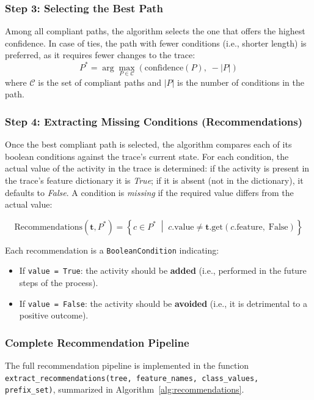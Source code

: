 \documentclass{article}
\begin{document}
\subsubsection{Step 3: Selecting the Best Path}

Among all compliant paths, the algorithm selects the one that offers the highest confidence. In case of ties, the path with fewer conditions (i.e., shorter length) is preferred, as it requires fewer changes to the trace:
\[
P^* = \arg\max_{P \in \mathcal{C}} \left( \text{confidence}(P), \; -|P| \right)
\]
where $\mathcal{C}$ is the set of compliant paths and $|P|$ is the number of conditions in the path.

\subsubsection{Step 4: Extracting Missing Conditions (Recommendations)}

Once the best compliant path is selected, the algorithm compares each of its boolean conditions against the trace's current state. For each condition, the actual value of the activity in the trace is determined: if the activity is present in the trace's feature dictionary it is \textit{True}; if it is absent (not in the dictionary), it defaults to \textit{False}. A condition is \textit{missing} if the required value differs from the actual value:

\[
\text{Recommendations}(\mathbf{t}, P^*) = \left\{ c \in P^* \;\middle|\; c.\text{value} \neq \mathbf{t}.\text{get}(c.\text{feature},\; \text{False}) \right\}
\]

\noindent
Each recommendation is a \texttt{BooleanCondition} indicating:
\begin{itemize}
    \item If \texttt{value = True}: the activity should be \textbf{added} (i.e., performed in the future steps of the process).
    \item If \texttt{value = False}: the activity should be \textbf{avoided} (i.e., it is detrimental to a positive outcome).
\end{itemize}

\subsubsection{Complete Recommendation Pipeline}

The full recommendation pipeline is implemented in the function \texttt{extract\_recommendations(tree, feature\_names, class\_values, prefix\_set)}, summarized in Algorithm~\ref{alg:recommendations}.
\end{document}
